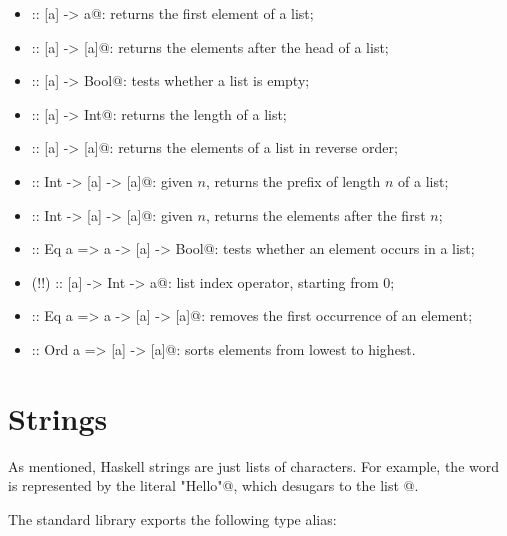 \documentclass[UdineBachThesis,american,11pt]{PhdThesis}
\begin{document}
  \begin{itemize}
    \item \lstinline@head :: [a] -> a@: returns the first element of a list;

    \item \lstinline@tail :: [a] -> [a]@: returns the elements after the head of
    a list;

    \item \lstinline@null :: [a] -> Bool@: tests whether a list is empty;

    \item \lstinline@length :: [a] -> Int@: returns the length of a list;

    \item \lstinline@reverse :: [a] -> [a]@: returns the elements of a list in
    reverse order;

    \item \lstinline@take :: Int -> [a] -> [a]@: given $n$, returns the prefix
    of length $n$ of a list;

    \item \lstinline@drop :: Int -> [a] -> [a]@: given $n$, returns the elements
    after the first $n$;

    \item \lstinline@elem :: Eq a => a -> [a] -> Bool@: tests whether an element
    occurs in a list;

    \item \lstinline@(!!) :: [a] -> Int -> a@: list index operator, starting
    from $0$;

    \item \lstinline@delete :: Eq a => a -> [a] -> [a]@: removes the first
    occurrence of an element;

    \item \lstinline@sort :: Ord a => [a] -> [a]@: sorts elements from lowest to
    highest.
  \end{itemize}

  \section{Strings}
  \label{section:strings}

  As mentioned, Haskell strings are just lists of characters. For example, the
  word \lstinline@Hello@ is represented by the literal \lstinline@"Hello"@,
  which desugars to the list \lstinline@['H', 'e', 'l', 'l', 'o']@.

  \pagebreak

  The standard library exports the following type alias:
\end{document}

